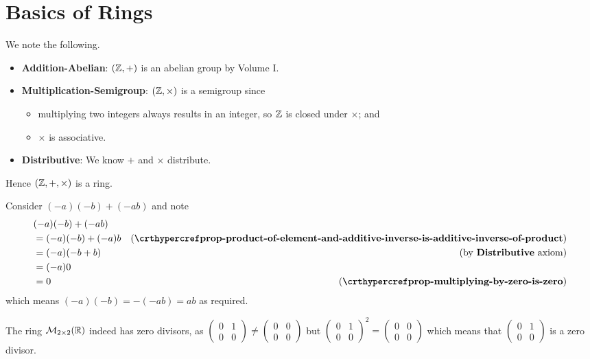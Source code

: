 \section{Basics of Rings}
\begin{questions}
    \item We note the following.
    \begin{itemize}
        \item \textbf{Addition-Abelian}: $(\mathbb{Z}, +)$ is an abelian group by Volume I.
        \item \textbf{Multiplication-Semigroup}: $(\mathbb{Z}, \times)$ is a semigroup since
        \begin{itemize}
            \item multiplying two integers always results in an integer, so $\mathbb{Z}$ is closed under $\times$; and
            \item $\times$ is associative.
        \end{itemize}
        \item \textbf{Distributive}: We know $+$ and $\times$ distribute.
    \end{itemize}
    Hence $(\mathbb{Z}, +, \times)$ is a ring.

    \item Consider $(-a)(-b) + (-ab)$ and note
    \begin{align*}
        &(-a)(-b) + (-ab)\\
        &= (-a)(-b) + (-a)b & (\text{\myref{prop-product-of-element-and-additive-inverse-is-additive-inverse-of-product}})\\
        &= (-a)(-b + b) & (\text{by \textbf{Distributive} axiom})\\
        &= (-a)0\\
        &= 0 & (\myref{prop-multiplying-by-zero-is-zero})
    \end{align*}
    which means $(-a)(-b) = -(-ab) = ab$ as required.

    \item The ring $\mathcal{M}_{2\times2}(\mathbb{R})$ indeed has zero divisors, as $\begin{pmatrix}0&1\\0&0\end{pmatrix} \neq \begin{pmatrix}0&0\\0&0\end{pmatrix}$ but $\begin{pmatrix}0&1\\0&0\end{pmatrix}^2 = \begin{pmatrix}0&0\\0&0\end{pmatrix}$ which means that $\begin{pmatrix}0&1\\0&0\end{pmatrix}$ is a zero divisor.
    

\end{questions}
